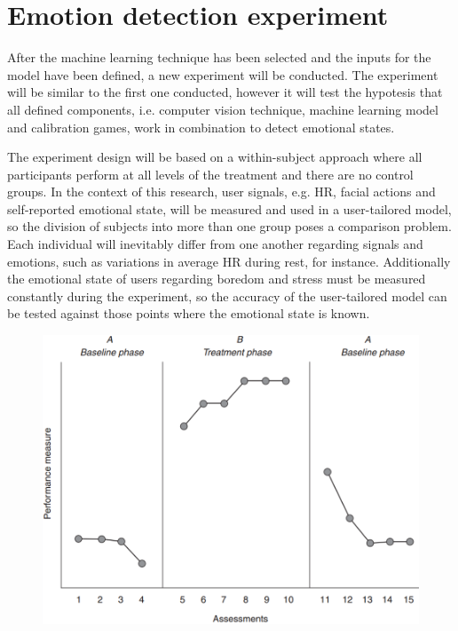 \section{Emotion detection experiment}
\label{closing:emotion-detection-experiment}

After the machine learning technique has been selected and the inputs for the model have been defined, a new experiment will be conducted. The experiment will be similar to the first one conducted, however it will test the hypotesis that all defined components, i.e. computer vision technique, machine learning model and calibration games, work in combination to detect emotional states.

The experiment design will be based on a within-subject approach \cite{lane2015online} where all participants perform at all levels of the treatment and there are no control groups. In the context of this research, user signals, e.g. HR, facial actions and self-reported emotional state, will be measured and used in a user-tailored model, so the division of subjects into more than one group poses a comparison problem. Each individual will inevitably differ from one another regarding signals and emotions, such as variations in average HR during rest, for instance. Additionally the emotional state of users regarding boredom and stress must be measured constantly during the experiment, so the accuracy of the user-tailored model can be tested against those points where the emotional state is known.

\begin{figure}[ht]
    \centering
    \includegraphics[scale=0.5]{figures/time-series-design-breakwell.png}
    \caption{\textcite{breakwell1994research}}
    \label{fig:time-series-design-breakwell}
\end{figure}

